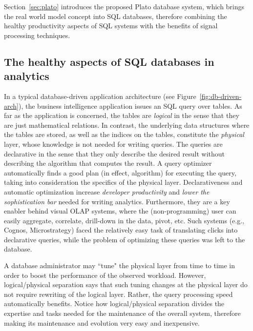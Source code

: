 Section~\ref{sec:plato} introduces the proposed Plato database system, which brings the real world model concept into SQL databases, therefore combining the healthy productivity aspects of SQL systems with the benefits of signal processing techniques.

\subsection{The healthy aspects of SQL databases in analytics}
\label{sec:healthy-aspects}
In a typical database-driven application architecture (see Figure~\ref{fig:db-driven-arch}), the business intelligence application issues an SQL query over tables. As far as the application is concerned, the tables are {\em logical} in the sense that they are just mathematical relations. In contrast, the underlying data structures where the tables are stored, as well as the indices on the tables, constitute the {\em physical} layer, whose knowledge is not needed for writing queries. The queries are declarative in the sense that they only describe the desired result without describing the algorithm that computes the result. A query optimizer automatically finds a good plan (in effect, algorithm) for executing the query, taking into consideration the specifics of the physical layer. Declarativeness and automatic optimization increase {\em developer productivity} and {\em lower the sophistication bar} needed for writing analytics. Furthermore, they are a key enabler behind visual OLAP systems, where the (non-programming) user can easily aggregate, correlate, drill-down in the data, pivot, etc. Such systems (e.g., Cognos, Microstrategy) faced the relatively easy task of translating clicks into declarative queries, while the problem of optimizing these queries was left to the database.


A database administrator may ``tune" the physical layer from time to time in order to boost the performance of the observed workload. However, logical/physical separation says that such tuning changes at the physical layer do not require rewriting of the logical layer. Rather, the query processing speed automatically benefits. Notice how logical/physical separation divides the expertise and tasks needed for the maintenance of the overall system, therefore making its maintenance and evolution very easy and inexpensive.

